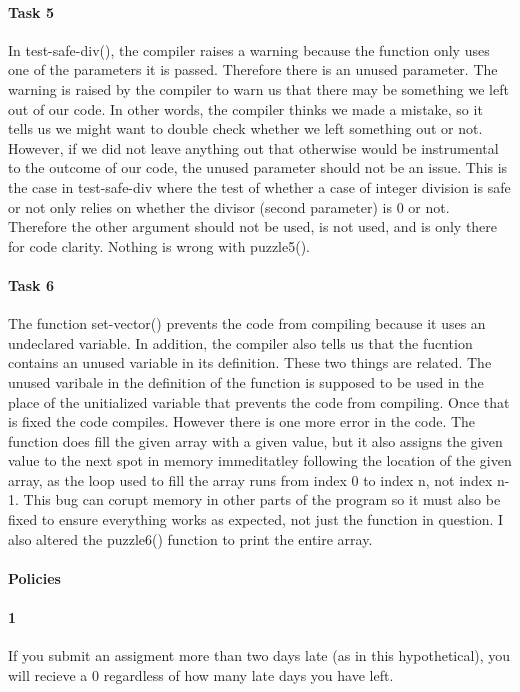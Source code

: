 \documentclass[11pt]{article}
\begin{document}
\paragraph{Task 5}
In test-safe-div(), the compiler raises a warning because the function only uses one of the parameters it is passed. Therefore there is an unused parameter. The warning is raised by the compiler to warn us that there may be something we left out of our code. In other words, the compiler thinks we made a mistake, so it tells us we might want to double check whether we left something out or not. However, if we did not leave anything out that otherwise would be instrumental to the outcome of our code, the unused parameter should not be an issue. This is the case in test-safe-div where the test of whether a case of integer division is safe or not only relies on whether the divisor (second parameter) is 0 or not. Therefore the other argument should not be used, is not used, and is only there for code clarity. Nothing is wrong with puzzle5().
\paragraph{Task 6}
The function set-vector() prevents the code from compiling because it uses an undeclared variable. In addition, the compiler also tells us that the fucntion contains an unused variable in its definition. These two things are related. The unused varibale in the definition of the function is supposed to be used in the place of the unitialized variable that prevents the code from compiling. Once that is fixed the code compiles. However there is one more error in the code. The function does fill the given array with a given value, but it also assigns the given value to the next spot in memory immeditatley following the location of the given array, as the loop used to fill the array runs from index 0 to index n, not index n-1. This bug can corupt memory in other parts of the program so it must also be fixed to ensure everything works as expected, not just the function in question. I also altered the puzzle6() function to print the entire array.

\paragraph{Policies}
\paragraph{1}
If you submit an assigment more than two days late (as in this hypothetical), you will recieve a 0 regardless of how many late days you have left.
\end{document}
